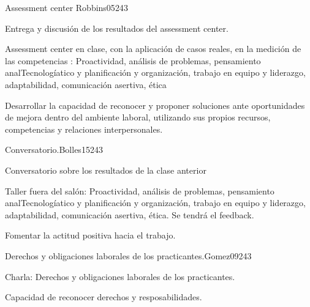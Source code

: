 \begin{syllabus}
\begin{unit}{Assessment center }{}{Robbins05}{24}{3}
   \begin{topics}
      \item Entrega y discusión de los resultados del assessment center.
      \item Assessment center en clase, con la aplicación de casos reales, en la medición de las competencias : Proactividad, análisis de problemas, pensamiento analTecnologíatico y planificación y organización, trabajo en equipo y liderazgo, adaptabilidad, comunicación asertiva, ética
    \end{topics}

   \begin{learningoutcomes}
      \item Desarrollar la capacidad de reconocer y proponer soluciones ante oportunidades de mejora dentro del ambiente laboral, utilizando sus propios recursos, competencias y relaciones interpersonales.
   \end{learningoutcomes}
\end{unit}

\begin{unit}{Conversatorio.}{}{Bolles15}{24}{3}
   \begin{topics}
      \item Conversatorio sobre los resultados de la clase anterior
      \item Taller fuera del salón: Proactividad, análisis de problemas, pensamiento analTecnologíatico y planificación y organización, trabajo en equipo y liderazgo, adaptabilidad, comunicación asertiva, ética. Se tendrá el feedback.
   \end{topics}

   \begin{learningoutcomes}
      \item Fomentar la actitud positiva hacia el trabajo.
   \end{learningoutcomes}
\end{unit}

\begin{unit}{Derechos y obligaciones laborales de los practicantes.}{}{Gomez09}{24}{3}
   \begin{topics}
      \item Charla: Derechos y obligaciones laborales de los practicantes.
   \end{topics}

   \begin{learningoutcomes}
      \item Capacidad de reconocer derechos y  resposabilidades.
   \end{learningoutcomes}
\end{unit}


\end{syllabus}
